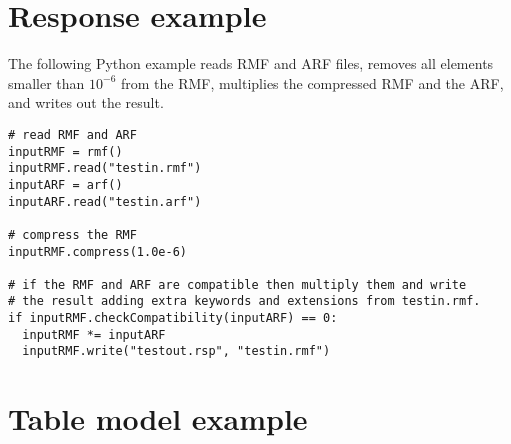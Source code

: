 \documentclass[11pt]{book}
\begin{document}
\section{Response example}

The following Python example reads RMF and ARF files, removes all
elements smaller than $10^{-6}$ from the RMF, multiplies the
compressed RMF and the ARF, and writes out the result.
\begin{verbatim}
# read RMF and ARF
inputRMF = rmf()
inputRMF.read("testin.rmf")
inputARF = arf()
inputARF.read("testin.arf")

# compress the RMF
inputRMF.compress(1.0e-6)

# if the RMF and ARF are compatible then multiply them and write
# the result adding extra keywords and extensions from testin.rmf.
if inputRMF.checkCompatibility(inputARF) == 0:
  inputRMF *= inputARF
  inputRMF.write("testout.rsp", "testin.rmf")

\end{verbatim}

\section{Table model example}
\end{document}
